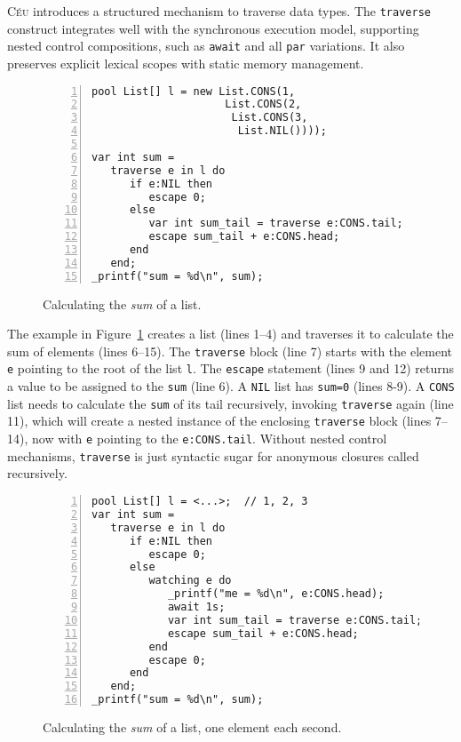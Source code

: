 \documentclass{acm_proc_article-sp}
\newcommand{\CEU}{\textsc{C\'{e}u}\xspace}
\newcommand{\code}[1] {{\small{\texttt{#1}}}}
\begin{document}
\CEU introduces a structured mechanism to traverse data types.
The \code{traverse} construct integrates well with the synchronous execution 
model, supporting nested control compositions, such as \code{await} and all 
\code{par} variations.
It also preserves explicit lexical scopes with static memory management.

\begin{figure}%
\begin{lstlisting}[numbers=left,xleftmargin=3em]
pool List[] l = new List.CONS(1,
                     List.CONS(2,
                      List.CONS(3,
                       List.NIL())));

var int sum =
   traverse e in l do
      if e:NIL then
         escape 0;
      else
         var int sum_tail = traverse e:CONS.tail;
         escape sum_tail + e:CONS.head;
      end
   end;
_printf("sum = %d\n", sum);
\end{lstlisting}
\caption{
Calculating the \emph{sum} of a list.
\label{lst.sum}
}
\end{figure}

The example in Figure~\ref{lst.sum} creates a list (lines 1--4) and traverses 
it to calculate the sum of elements (lines 6--15).
The \code{traverse} block (line 7) starts with the element \code{e} pointing to 
the root of the list \code{l}.
The \code{escape} statement (lines 9 and 12) returns a value to be assigned to 
the \code{sum} (line 6).
A \code{NIL} list has \code{sum=0} (lines 8-9).
A \code{CONS} list needs to calculate the \code{sum} of its tail recursively, 
invoking \code{traverse} again (line 11), which will create a nested instance 
of the enclosing \code{traverse} block (lines 7--14), now with \code{e} 
pointing to the \code{e:CONS.tail}.
Without nested control mechanisms, \code{traverse} is just syntactic sugar for 
anonymous closures called recursively.

\begin{figure}%
\begin{lstlisting}[numbers=left,xleftmargin=3em]
pool List[] l = <...>;  // 1, 2, 3
var int sum =
   traverse e in l do
      if e:NIL then
         escape 0;
      else
         watching e do
            _printf("me = %d\n", e:CONS.head);
            await 1s;
            var int sum_tail = traverse e:CONS.tail;
            escape sum_tail + e:CONS.head;
         end
         escape 0;
      end
   end;
_printf("sum = %d\n", sum);
\end{lstlisting}
\caption{
Calculating the \emph{sum} of a list, one element each second.
\label{lst.sum.react}
}
\end{figure}
\end{document}
